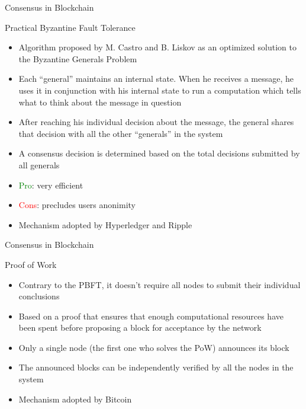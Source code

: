 \documentclass{beamer}
\newcommand\red[1]{\textcolor{red}{#1}}
\begin{document}
  \begin{frame}{Consensus in Blockchain}
    \begin{block}{Practical Byzantine Fault Tolerance}
      \begin{itemize}
        \item Algorithm proposed by M. Castro and B. Liskov as an optimized
        solution to the Byzantine Generals Problem \cite{castro1999practical} \pause
        \item Each “general” maintains an internal state. When he receives a
        message, he uses it in conjunction with his internal state to
        run a computation which tells what to think about the message in question \pause
        \item  After reaching his individual decision about the message,
        the general shares that decision with all the other “generals” in the system \pause
        \item  A consensus decision is determined based on the total decisions
        submitted by all generals \pause
        \item \textcolor{green}{Pro}: very efficient \pause
        \item \red{Cons}: precludes users anonimity \pause
        \item Mechanism adopted by Hyperledger and Ripple
      \end{itemize}
    \end{block}
  \end{frame}




  \begin{frame}{Consensus in Blockchain}
    \begin{block}{Proof of Work}
      \begin{itemize}
        \item Contrary to the PBFT, it doesn’t require all nodes to submit
        their individual conclusions \pause
        \item Based on a proof that ensures that enough computational resources have
        been spent before proposing a block for acceptance by the network \pause
        \item Only a single node (the first one who solves the PoW) announces its
        block \pause
        \item The announced blocks can be independently verified by all
        the nodes in the system \pause
        \item Mechanism adopted by Bitcoin
      \end{itemize}
    \end{block}
  \end{frame}
\end{document}
